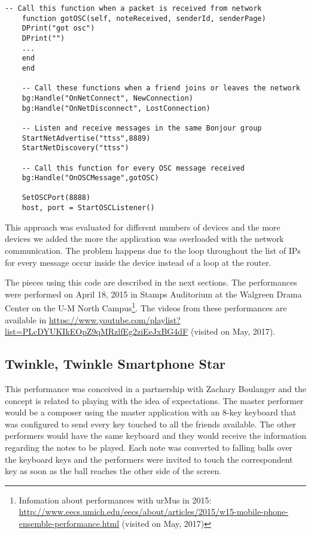 \begin{footnotesize}
\begin{lstlisting}[frame=single]
	-- Call this function when a packet is received from network
	function gotOSC(self, noteReceived, senderId, senderPage)
	DPrint("got osc")
	DPrint("")
	...
	end
	end
	
	-- Call these functions when a friend joins or leaves the network
	bg:Handle("OnNetConnect", NewConnection)
	bg:Handle("OnNetDisconnect", LostConnection)
	
	-- Listen and receive messages in the same Bonjour group
	StartNetAdvertise("ttss",8889)
	StartNetDiscovery("ttss")
	
	-- Call this function for every OSC message received
	bg:Handle("OnOSCMessage",gotOSC)
	
	SetOSCPort(8888)
	host, port = StartOSCListener()
	\end{lstlisting}
\end{footnotesize}

This approach was evaluated for different numbers of devices and the more devices we added the more the application was overloaded with the network communication.
The problem happens due to the loop throughout the list of IPs for every message occur inside the device instead of a loop at the router.

The pieces using this code are described in the next sections.
The performances were performed on April 18, 2015 in Stamps Auditorium at the Walgreen Drama Center on the U-M North Campus\footnote{Infomation about performances with urMus in 2015: \url{http://www.eecs.umich.edu/eecs/about/articles/2015/w15-mobile-phone-ensemble-performance.html} (visited on May, 2017)}.
The videos from these performances are available in \url{https://www.youtube.com/playlist?list=PLcDYUKIkEOpZ9qMRzlfEg2ziEeJxBG4dF} (visited on May, 2017).

\subsection*{Twinkle, Twinkle Smartphone Star}

This performance was conceived in a partnership with Zachary Boulanger and the concept is related to playing with the idea of expectations. 
The master performer would be a composer using the master application with an 8-key keyboard that was configured to send every key touched to all the friends available.
The other performers would have the same keyboard and they would receive the information regarding the notes to be played.
Each note was converted to falling balls over the keyboard keys and the performers were invited to touch the correspondent key as soon as the ball reaches the other side of the screen.

